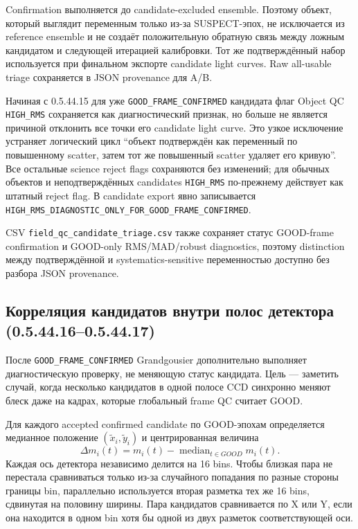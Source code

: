 Confirmation выполняется до candidate-excluded ensemble. Поэтому объект, который выглядит переменным
только из-за SUSPECT-эпох, не исключается из reference ensemble и не создаёт положительную обратную связь
между ложным кандидатом и следующей итерацией калибровки. Тот же подтверждённый набор используется при
финальном экспорте candidate light curves. Raw all-usable triage сохраняется в JSON provenance для A/B.

Начиная с 0.5.44.15 для уже \texttt{GOOD\_FRAME\_CONFIRMED} кандидата флаг Object QC
\texttt{HIGH\_RMS} сохраняется как диагностический признак, но больше не является причиной отклонить
все точки его candidate light curve. Это узкое исключение устраняет логический цикл ``объект подтверждён
как переменный по повышенному scatter, затем тот же повышенный scatter удаляет его кривую''. Все остальные
science reject flags сохраняются без изменений; для обычных объектов и неподтверждённых candidates
\texttt{HIGH\_RMS} по-прежнему действует как штатный reject flag. В candidate export явно записывается
\texttt{HIGH\_RMS\_DIAGNOSTIC\_ONLY\_FOR\_GOOD\_FRAME\_CONFIRMED}.

CSV \texttt{field\_qc\_candidate\_triage.csv} также сохраняет статус GOOD-frame confirmation и
GOOD-only RMS/MAD/robust diagnostics, поэтому distinction между подтверждённой и
systematics-sensitive переменностью доступно без разбора JSON provenance.


\subsection{Корреляция кандидатов внутри полос детектора (0.5.44.16--0.5.44.17)}

После \texttt{GOOD\_FRAME\_CONFIRMED} Grandgousier дополнительно выполняет диагностическую проверку,
не меняющую статус кандидата. Цель --- заметить случай, когда несколько кандидатов в одной полосе CCD
синхронно меняют блеск даже на кадрах, которые глобальный frame QC считает GOOD.

Для каждого accepted confirmed candidate по GOOD-эпохам определяется медианное положение
$(\widetilde x_i,\widetilde y_i)$ и центрированная величина
\begin{equation}
 \Delta m_i(t)=m_i(t)-\operatorname{median}_{t\in GOOD}m_i(t).
\end{equation}
Каждая ось детектора независимо делится на 16 bins. Чтобы близкая пара не перестала сравниваться только
из-за случайного попадания по разные стороны границы bin, параллельно используется вторая разметка тех же
16 bins, сдвинутая на половину ширины. Пара кандидатов сравнивается по X или Y, если она находится в
одном bin хотя бы одной из двух разметок соответствующей оси.

